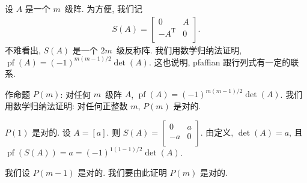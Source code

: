 \begin{example}
    设 \(A\) 是一个 \(m\)~级阵.
    为方便, 我们记
    \begin{align*}
        S(A) = \begin{bmatrix}
                   0               & A \\
                   -A^{\mathrm{T}} & 0 \\
               \end{bmatrix}.
    \end{align*}
    不难看出, \(S(A)\) 是一个 \(2m\)~级反称阵.
    我们用数学归纳法证明,
    \(\operatorname{pf} {(A)} = (-1)^{m(m-1)/2} \det {(A)}\).
    这也说明, pfaffian 跟行列式有一定的联系.

    作命题 \(P(m)\):
    对任何 \(m\)~级阵 \(A\),
    \(\operatorname{pf} {(A)} = (-1)^{m(m-1)/2} \det {(A)}\).
    我们用数学归纳法证明:
    对任何正整数 \(m\), \(P(m)\) 是对的.

    \(P(1)\) 是对的.
    设 \(A = [a]\).
    则 \(S(A) = \begin{bmatrix}
        0  & a \\
        -a & 0 \\
    \end{bmatrix}\).
    由定义, \(\det {(A)} = a\),
    且
    \(\operatorname{pf} {(S(A))} = a = (-1)^{1(1-1)/2} \det {(A)}\).

    我们设 \(P(m-1)\) 是对的.
    我们要由此证明 \(P(m)\) 是对的.


\end{example}
